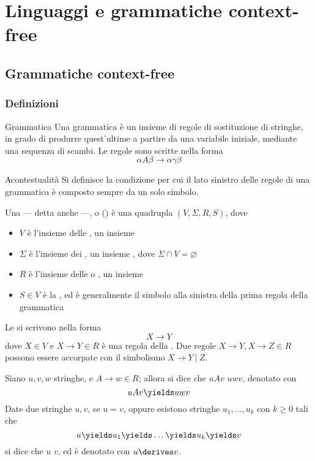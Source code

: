 \documentclass[a4paper, 12pt]{report}
\begin{document}
    \chapter{Linguaggi e grammatiche context-free}

    \section{Grammatiche context-free}

    \subsection{Definizioni}

    \begin{frameddefn}{Grammatica}
        Una grammatica è un insieme di regole di sostituzione di stringhe, in grado di produrre quest'ultime a partire da una variabile iniziale, mediante una sequenza di scambi. Le regole sono scritte nella forma $$\alpha A \beta \to \alpha \gamma \beta$$
    \end{frameddefn}

    \begin{frameddefn}{Acontestualità}
        Si definisce  la condizione per cui il lato sinistro delle regole di una grammatica è composto sempre da un solo simbolo.
    \end{frameddefn}

    \begin{frameddefn}{\CFG}
        Una  --- detta anche  ---, o \CFG () è una quadrupla $(V, \Sigma, R, S)$, dove

        \begin{itemize}
            \item $V$ è l'insieme delle , un insieme 
            \item $\Sigma$ è l'insieme dei , un insieme , dove $\Sigma \cap V = \varnothing$
            \item $R$ è l'insieme delle  o , un insieme 
            \item $S \in V$ è la , ed è generalmente il simbolo alla sinistra della prima regola della grammatica
        \end{itemize}

        Le \CFG si scrivono nella forma $$X \to Y$$ dove $X \in V$ e $X \to Y \in R$ è una regola della \CFG. Due regole $X \to Y, X \to Z \in R$ possono essere accorpate con il simbolismo $X \to Y \ | \ Z$.

        Siano $u, v, w$ stringhe, e $A \to w \in R$; allora si dice che $uAv$  $uwv$, denotato con $$uAv \yields uwv$$ Date due stringhe $u, v$, se $u = v$, oppure esistono stringhe $u_1, \ldots, u_k$ con $k \ge 0$ tali che $$u \yields u_1 \yields \ldots \yields u_k \yields v$$ si dice che $u$  $v$, ed è denotato con $u \derives v$.
    \end{frameddefn}
\end{document}
